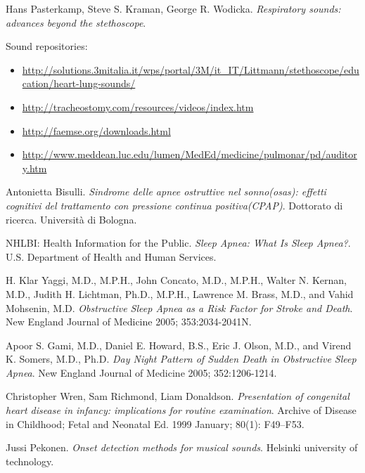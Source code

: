 \begin{thebibliography}{99}
  Hans Pasterkamp, Steve S. Kraman, George R. Wodicka.
  \emph{Respiratory sounds: advances beyond the stethoscope}.

  Sound repositories:
  \begin{itemize}
    \item 
      \url{http://solutions.3mitalia.it/wps/portal/3M/it_IT/Littmann/stethoscope/education/heart-lung-sounds/}    
    \item
      \url{http://tracheostomy.com/resources/videos/index.htm}
    \item
      \url{http://faemse.org/downloads.html}
    \item
      \url{http://www.meddean.luc.edu/lumen/MedEd/medicine/pulmonar/pd/auditory.htm}
  \end{itemize}

  

  Antonietta Bisulli.
  \emph{Sindrome delle apnee ostruttive nel sonno(osas): effetti cognitivi del trattamento con pressione continua positiva(CPAP)}.
  Dottorato di ricerca. Universit\`a di Bologna.
  
  NHLBI: Health Information for the Public. 
  \emph{Sleep Apnea: What Is Sleep Apnea?}.
  U.S. Department of Health and Human Services. 

  H. Klar Yaggi, M.D., M.P.H., John Concato, M.D., M.P.H., Walter N. Kernan,
  M.D., Judith H. Lichtman, Ph.D., M.P.H., Lawrence M. Brass, M.D., and Vahid Mohsenin, M.D.
  \emph{Obstructive Sleep Apnea as a Risk Factor for Stroke and Death}.
  New England Journal of Medicine 2005; 353:2034-2041N.

  Apoor S. Gami, M.D., Daniel E. Howard, B.S., Eric J. Olson, M.D., and Virend K. Somers, M.D., Ph.D.
  \emph{Day Night Pattern of Sudden Death in Obstructive Sleep Apnea}.
  New England Journal of Medicine 2005; 352:1206-1214.

  Christopher Wren, Sam Richmond, Liam Donaldson.
  \emph{Presentation of congenital heart disease in infancy: implications for routine examination}.
  Archive of Disease in Childhood; Fetal and Neonatal Ed. 1999 January; 80(1): F49–F53.


  Jussi Pekonen.
  \emph{Onset detection methods for musical sounds}.
  Helsinki university of technology.


\end{thebibliography}
